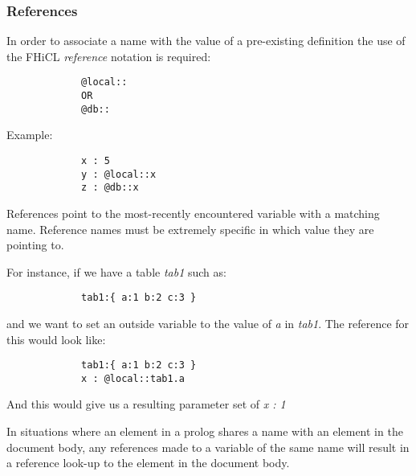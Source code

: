 \documentclass{memarticle}
\begin{document}
{                \subsubsection{References}
                        In order to associate a name
                        with the value of a pre-existing definition
                        the use of the FHiCL \emph{reference} notation is required:
                        \begin{verbatim}
             @local::
             OR
             @db::
                        \end{verbatim}
                        Example:
                        \begin{verbatim}
             x : 5
             y : @local::x
             z : @db::x
                        \end{verbatim}
                        \par
                        References point to the most-recently encountered variable
                        with a matching name.
                        Reference names must be extremely specific
                        in which value they are pointing to.
                        \par
                        For instance, if we have a table \emph{tab1} such as:
                        \begin{verbatim}
             tab1:{ a:1 b:2 c:3 }
                        \end{verbatim}
                        and we want to set an outside variable to the value of \emph{a} in \emph{tab1}.
                        The reference for this would look like:
                        \begin{verbatim}
             tab1:{ a:1 b:2 c:3 }
             x : @local::tab1.a
                        \end{verbatim}
                        And this would give us a resulting parameter set of \emph{x : 1}
                        \par
                        In situations where an element in a prolog shares a name with an element in the document body,
                        any references made to a variable of the same name will result in a reference look-up to the element
                        in the document body.
}
\end{document}
